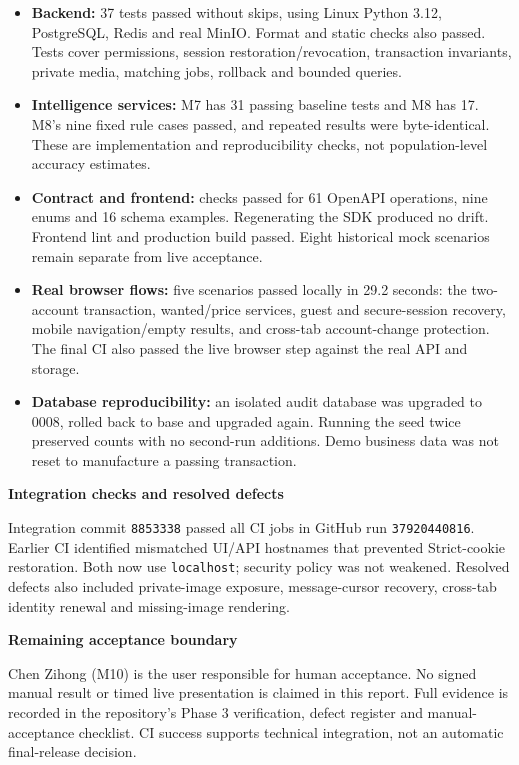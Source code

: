 \documentclass[12pt,a4paper]{article}
\newcommand{\heading}[1]{\vspace{6pt}\textbf{#1}\par}
\begin{document}
\begin{itemize}
\item \textbf{Backend:} 37 tests passed without skips, using Linux Python 3.12, PostgreSQL, Redis and real MinIO. Format and static checks also passed. Tests cover permissions, session restoration/revocation, transaction invariants, private media, matching jobs, rollback and bounded queries.
\item \textbf{Intelligence services:} M7 has 31 passing baseline tests and M8 has 17. M8's nine fixed rule cases passed, and repeated results were byte-identical. These are implementation and reproducibility checks, not population-level accuracy estimates.
\item \textbf{Contract and frontend:} checks passed for 61 OpenAPI operations, nine enums and 16 schema examples. Regenerating the SDK produced no drift. Frontend lint and production build passed. Eight historical mock scenarios remain separate from live acceptance.
\item \textbf{Real browser flows:} five scenarios passed locally in 29.2 seconds: the two-account transaction, wanted/price services, guest and secure-session recovery, mobile navigation/empty results, and cross-tab account-change protection. The final CI also passed the live browser step against the real API and storage.
\item \textbf{Database reproducibility:} an isolated audit database was upgraded to 0008, rolled back to base and upgraded again. Running the seed twice preserved counts with no second-run additions. Demo business data was not reset to manufacture a passing transaction.
\end{itemize}

\heading{Integration checks and resolved defects}
Integration commit \texttt{8853338} passed all CI jobs in GitHub run \texttt{37920440816}. Earlier CI identified mismatched UI/API hostnames that prevented Strict-cookie restoration. Both now use \texttt{localhost}; security policy was not weakened. Resolved defects also included private-image exposure, message-cursor recovery, cross-tab identity renewal and missing-image rendering.

\heading{Remaining acceptance boundary}
Chen Zihong (M10) is the user responsible for human acceptance. No signed manual result or timed live presentation is claimed in this report. Full evidence is recorded in the repository's Phase 3 verification, defect register and manual-acceptance checklist. CI success supports technical integration, not an automatic final-release decision.
\end{document}
